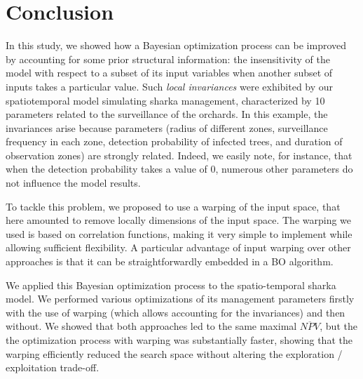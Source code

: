 \section{Conclusion}
In this study, we showed how a Bayesian optimization process can be improved by accounting for some prior structural information: 
the insensitivity of the model with respect to a subset of its input variables when another subset of inputs takes a particular value.
Such \textit{local invariances} were exhibited by our
spatiotemporal model simulating sharka management, characterized by 10 parameters related to the surveillance of the orchards. 
In this example, the invariances arise because parameters (radius of different zones, surveillance frequency in each zone, detection probability of infected trees, 
and duration of observation zones) are strongly related. Indeed, we easily note, for instance, that when the detection probability takes a value of 0, 
numerous other parameters do not influence the model results. 
% 

To tackle this problem, we proposed to use a warping of the input space, that here amounted to remove locally dimensions of the input space.
The warping we used is based on correlation functions, making it very simple to implement while allowing sufficient flexibility.
A particular advantage of input warping over other approaches is that it can be straightforwardly embedded in a BO algorithm. 
% 

We applied this Bayesian optimization process to the spatio-temporal sharka model. We performed various optimizations of its management parameters 
firstly with the use of warping (which allows accounting for the invariances) and then without. 
We showed that both approaches led to the same maximal $\overline{NPV}$, but the the optimization process with warping was substantially faster,
showing that the warping efficiently reduced the search space without altering the exploration / exploitation trade-off.

